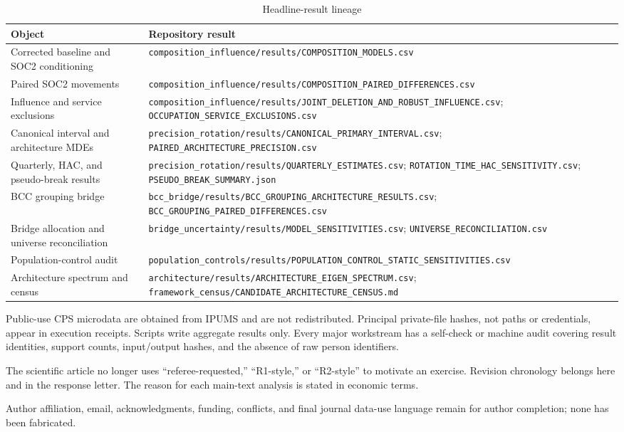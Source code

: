 \begin{table}[htbp]
\centering
\caption{Headline-result lineage}\label{tab:applineage}
\scriptsize
\begin{tabularx}{\textwidth}{Yp{.39\textwidth}}
\toprule
Object & Repository result \\
\midrule
Corrected baseline and SOC2 conditioning & \nolinkurl{composition_influence/results/COMPOSITION_MODELS.csv} \\
Paired SOC2 movements & \nolinkurl{composition_influence/results/COMPOSITION_PAIRED_DIFFERENCES.csv} \\
Influence and service exclusions & \nolinkurl{composition_influence/results/JOINT_DELETION_AND_ROBUST_INFLUENCE.csv}; \nolinkurl{OCCUPATION_SERVICE_EXCLUSIONS.csv} \\
Canonical interval and architecture MDEs & \nolinkurl{precision_rotation/results/CANONICAL_PRIMARY_INTERVAL.csv}; \nolinkurl{PAIRED_ARCHITECTURE_PRECISION.csv} \\
Quarterly, HAC, and pseudo-break results & \nolinkurl{precision_rotation/results/QUARTERLY_ESTIMATES.csv}; \nolinkurl{ROTATION_TIME_HAC_SENSITIVITY.csv}; \nolinkurl{PSEUDO_BREAK_SUMMARY.json} \\
BCC grouping bridge & \nolinkurl{bcc_bridge/results/BCC_GROUPING_ARCHITECTURE_RESULTS.csv}; \nolinkurl{BCC_GROUPING_PAIRED_DIFFERENCES.csv} \\
Bridge allocation and universe reconciliation & \nolinkurl{bridge_uncertainty/results/MODEL_SENSITIVITIES.csv}; \nolinkurl{UNIVERSE_RECONCILIATION.csv} \\
Population-control audit & \nolinkurl{population_controls/results/POPULATION_CONTROL_STATIC_SENSITIVITIES.csv} \\
Architecture spectrum and census & \nolinkurl{architecture/results/ARCHITECTURE_EIGEN_SPECTRUM.csv}; \nolinkurl{framework_census/CANDIDATE_ARCHITECTURE_CENSUS.md} \\
\bottomrule
\end{tabularx}
\end{table}

Public-use CPS microdata are obtained from IPUMS and are not redistributed. Principal private-file hashes, not paths or credentials, appear in execution receipts. Scripts write aggregate results only. Every major workstream has a self-check or machine audit covering result identities, support counts, input/output hashes, and the absence of raw person identifiers.

The scientific article no longer uses ``referee-requested,'' ``R1-style,'' or ``R2-style'' to motivate an exercise. Revision chronology belongs here and in the response letter. The reason for each main-text analysis is stated in economic terms.

Author affiliation, email, acknowledgments, funding, conflicts, and final journal data-use language remain for author completion; none has been fabricated.
